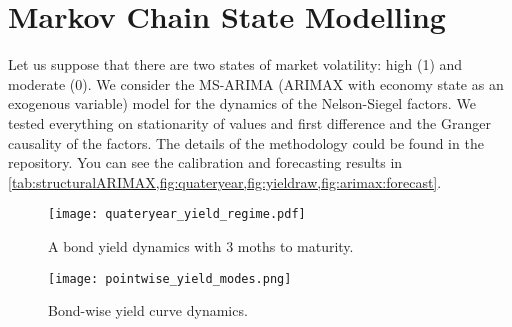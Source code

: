 \section{Markov Chain State Modelling}\label{sec:MCSM}
    Let us suppose that there are two states of market volatility: high (1) and moderate (0).
    We consider the MS-ARIMA (ARIMAX with economy state as an exogenous variable) model for the dynamics of the Nelson-Siegel factors.
    We tested everything on stationarity of values and first difference and the Granger causality of the factors. The details of the methodology could be found in the repository.
    You can see the calibration and forecasting results in \cref{tab:structuralARIMAX,fig:quateryear,fig:yieldraw,fig:arimax:forecast}.


    \begin{figure}[htbp]
        \texttt{[image: quateryear\_yield\_regime.pdf]}
        \caption{A bond yield dynamics with 3 moths to maturity.}
        \label{fig:quateryear}
    \end{figure}

    \begin{figure}[htbp]
        \texttt{[image: pointwise\_yield\_modes.png]}
        \caption{Bond-wise yield curve dynamics.}
        \label{fig:yieldraw}
    \end{figure}

